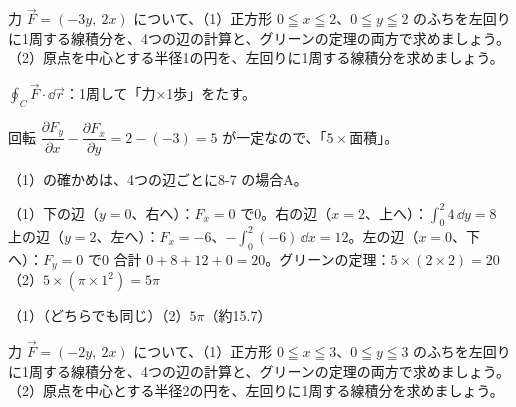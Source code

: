 \begin{reidai}
力 $\vec F=(-3y,\ 2x)$ について、（1）正方形 $0\leqq x\leqq2$、$0\leqq y\leqq2$ のふちを左回りに1周する線積分を、4つの辺の計算と、グリーンの定理の両方で求めましょう。（2）原点を中心とする半径1の円を、左回りに1周する線積分を求めましょう。\par
\kangaekata {}\par
{}\enspace $\oint_C\vec F\cdot\dd\vec r$：1周して「力×1歩」をたす。\par
{}\enspace 回転 $\dfrac{\partial F_y}{\partial x}-\dfrac{\partial F_x}{\partial y}=2-(-3)=5$ が一定なので、「$5\times$面積」。\par
{}\enspace（1）の確かめは、4つの辺ごとに8-7 の場合A。\par
\shiki（1）下の辺（$y=0$、右へ）：$F_x=0$ で0。右の辺（$x=2$、上へ）：$\int_0^2 4\,\dd y=8$\kviiilq
上の辺（$y=2$、左へ）：$F_x=-6$、$-\int_0^2(-6)\,\dd x=12$。左の辺（$x=0$、下へ）：$F_y=0$ で0\kviiilq
合計 $0+8+12+0=20$。グリーンの定理：$5\times(2\times2)=20$\kviiilq
（2）$5\times(\pi\times1^2)=5\pi$\par
\kotae（1）（どちらでも同じ）\quad（2）\nobreak $5\pi$（約15.7）
\end{reidai}

\begin{jibun}
力 $\vec F=(-2y,\ 2x)$ について、（1）正方形 $0\leqq x\leqq3$、$0\leqq y\leqq3$ のふちを左回りに1周する線積分を、4つの辺の計算と、グリーンの定理の両方で求めましょう。（2）原点を中心とする半径2の円を、左回りに1周する線積分を求めましょう。
\end{jibun}

